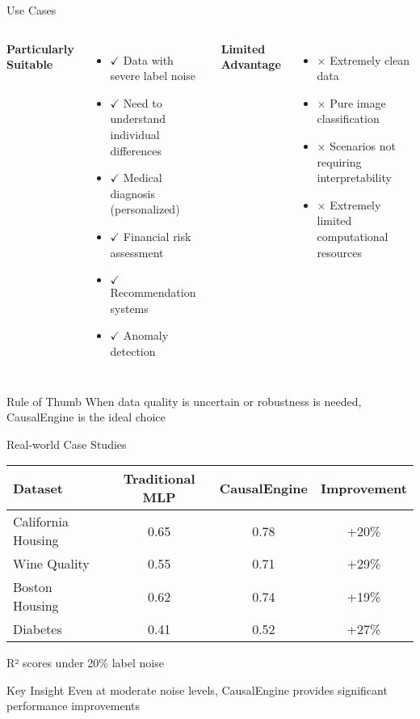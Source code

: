 \documentclass[aspectratio=169,10pt]{beamer}
\begin{document}
\begin{frame}{Use Cases}
\begin{columns}
\textbf{Particularly Suitable}
\begin{itemize}
    \item $\checkmark$ Data with severe label noise
    \item $\checkmark$ Need to understand individual differences
    \item $\checkmark$ Medical diagnosis (personalized)
    \item $\checkmark$ Financial risk assessment
    \item $\checkmark$ Recommendation systems
    \item $\checkmark$ Anomaly detection
\end{itemize}

\textbf{Limited Advantage}
\begin{itemize}
    \item $\times$ Extremely clean data
    \item $\times$ Pure image classification
    \item $\times$ Scenarios not requiring interpretability
    \item $\times$ Extremely limited computational resources
\end{itemize}
\end{columns}

\vspace{1em}
\begin{block}{Rule of Thumb}
When data quality is uncertain or robustness is needed, CausalEngine is the ideal choice
\end{block}
\end{frame}

\begin{frame}{Real-world Case Studies}
\begin{table}
\centering
\begin{tabular}{|l|c|c|c|}
\hline
\textbf{Dataset} & \textbf{Traditional MLP} & \textbf{CausalEngine} & \textbf{Improvement} \\
\hline
California Housing & 0.65 & 0.78 & +20\% \\
Wine Quality & 0.55 & 0.71 & +29\% \\
Boston Housing & 0.62 & 0.74 & +19\% \\
Diabetes & 0.41 & 0.52 & +27\% \\
\hline
\end{tabular}
\end{table}
{\footnotesize *R² scores under 20\% label noise}

\vspace{1em}
\begin{alertblock}{Key Insight}
Even at moderate noise levels, CausalEngine provides significant performance improvements
\end{alertblock}
\end{frame}
\end{document}
